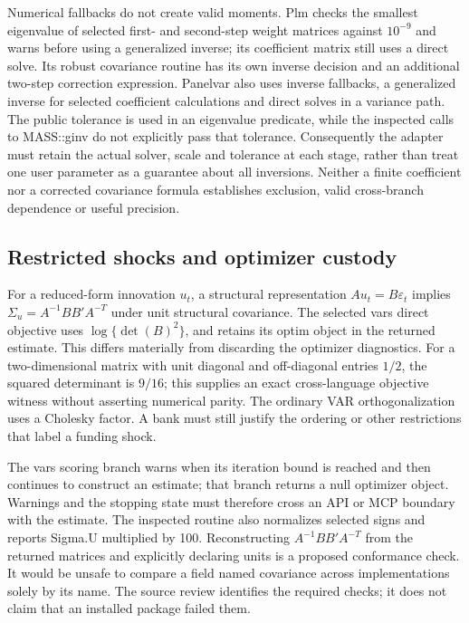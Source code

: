 Numerical fallbacks do not create valid moments. Plm checks the smallest eigenvalue of selected first- and second-step weight matrices against $10^{-9}$ and warns before using a generalized inverse; its coefficient matrix still uses a direct solve. Its robust covariance routine has its own inverse decision and an additional two-step correction expression. Panelvar also uses inverse fallbacks, a generalized inverse for selected coefficient calculations and direct solves in a variance path. The public tolerance is used in an eigenvalue predicate, while the inspected calls to MASS::ginv do not explicitly pass that tolerance. Consequently the adapter must retain the actual solver, scale and tolerance at each stage, rather than treat one user parameter as a guarantee about all inversions. Neither a finite coefficient nor a corrected covariance formula establishes exclusion, valid cross-branch dependence or useful precision.~\citep{exec25_rdyn_plm,exec25_rdyn_panelvar}

\subsection{Restricted shocks and optimizer custody}

For a reduced-form innovation $u_t$, a structural representation $Au_t=B\varepsilon_t$ implies $\Sigma_u=A^{-1}BB'A^{-T}$ under unit structural covariance. The selected vars direct objective uses $\log\{\det(B)^2\}$, and retains its optim object in the returned estimate. This differs materially from discarding the optimizer diagnostics. For a two-dimensional matrix with unit diagonal and off-diagonal entries $1/2$, the squared determinant is $9/16$; this supplies an exact cross-language objective witness without asserting numerical parity. The ordinary VAR orthogonalization uses a Cholesky factor. A bank must still justify the ordering or other restrictions that label a funding shock.~\citep{exec25_rdyn_vars,exec25_rdyn_choice}

The vars scoring branch warns when its iteration bound is reached and then continues to construct an estimate; that branch returns a null optimizer object. Warnings and the stopping state must therefore cross an API or MCP boundary with the estimate. The inspected routine also normalizes selected signs and reports Sigma.U multiplied by 100. Reconstructing $A^{-1}BB'A^{-T}$ from the returned matrices and explicitly declaring units is a proposed conformance check. It would be unsafe to compare a field named covariance across implementations solely by its name. The source review identifies the required checks; it does not claim that an installed package failed them.~\citep{exec25_rdyn_vars}

